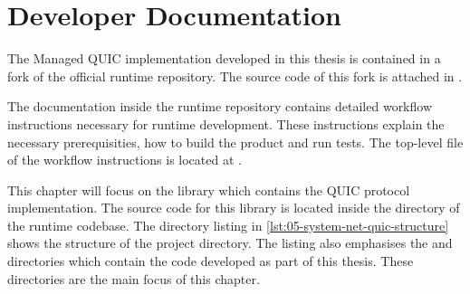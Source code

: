 \chapter{Developer Documentation}

The Managed QUIC implementation developed in this thesis is contained in a fork of the official
\dotnet{} runtime repository. The source code of this fork is attached in .

The documentation inside the \dotnet{} runtime repository contains detailed workflow instructions
necessary for \dotnet{} runtime development. These instructions explain the necessary
prerequisities, how to build the product and run tests. The top-level file of the workflow
instructions is located at .

This chapter will focus on the  library which contains the QUIC protocol
implementation. The source code for this library is located inside the
 directory of the \dotnet{} runtime
codebase. The directory listing in \autoref{lst:05-system-net-quic-structure} shows the structure of
the  project directory. The listing also emphasises the 
and  directories which contain the code developed as part of this thesis. These
directories are the main focus of this chapter.

\newcommand{\mydtcomment}[1]{\DTcomment{#1}}
\DTsetlength{0.2em}{0.6em}{0.2em}{0.4pt}{1.6pt}
\renewcommand{\DTstylecomment}[1]{{\footnotesize\rmfamily #1}}
\renewcommand{\DTstyle}[1]{{\footnotesize\texttt{#1}}}
\newcommand{\dtemph}[1]{\textcolor{dtemphcolor}{\emph{#1}}}

